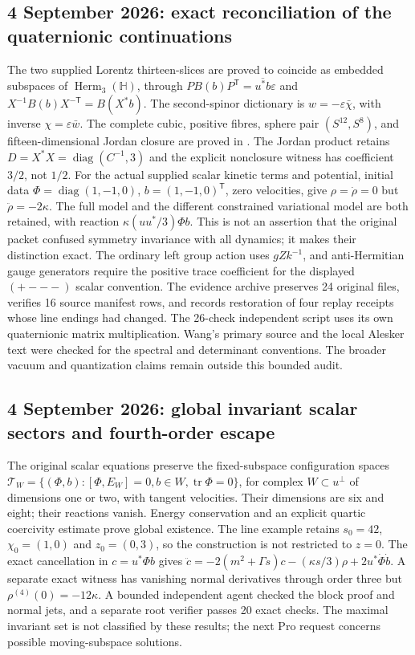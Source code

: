 \subsection*{4 September 2026: exact reconciliation of the quaternionic continuations}
The two supplied Lorentz thirteen-slices are proved to coincide as embedded
subspaces of $\operatorname{Herm}_3(\mathbb H)$, through
$PB(b)P^{\mathsf T}=\overline{u^*b}\varepsilon$ and
$X^{-1}B(b)X^{-\mathsf T}=B(X^*b)$. The second-spinor dictionary is
$w=-\varepsilon\bar\chi$, with inverse $\chi=\varepsilon\bar w$.
The complete cubic, positive fibres, sphere pair $(S^{12},S^8)$, and
fifteen-dimensional Jordan closure are proved in
.
The Jordan product retains $D=X^*X=\operatorname{diag}(C^{-1},3)$ and the
explicit nonclosure witness has coefficient $3/2$, not $1/2$.
For the actual supplied scalar kinetic terms and potential, initial data
$\Phi=\operatorname{diag}(1,-1,0)$, $b=(1,-1,0)^{\mathsf T}$, zero velocities,
give $\rho=\dot\rho=0$ but $\ddot\rho=-2\kappa$.
The full model and the different constrained variational model are both
retained, with reaction $\kappa(uu^*/3)\Phi b$. This is not an assertion
that the original packet confused symmetry invariance with all dynamics;
it makes their distinction exact. The ordinary left group action uses
$gZk^{-1}$, and anti-Hermitian gauge generators require the positive trace
coefficient for the displayed $(+---)$ scalar convention.
The evidence archive preserves 24 original files, verifies 16 source
manifest rows, and records restoration of four replay receipts whose line
endings had changed. The 26-check independent script uses its own
quaternionic matrix multiplication. Wang's primary source and the local
Alesker text were checked for the spectral and determinant conventions.
The broader vacuum and quantization claims remain outside this bounded audit.

\subsection*{4 September 2026: global invariant scalar sectors and fourth-order escape}
The original scalar equations preserve the fixed-subspace configuration
spaces $\mathcal T_W=\{(\Phi,b):[\Phi,E_W]=0,b\in W,\operatorname{tr}\Phi=0\}$,
for complex $W\subset u^\perp$ of dimensions one or two, with tangent
velocities. Their dimensions are six and eight; their reactions vanish.
Energy conservation and an explicit quartic coercivity estimate prove
global existence. The line example retains $s_0=42$, $\chi_0=(1,0)$ and
$z_0=(0,3)$, so the construction is not restricted to $z=0$.
The exact cancellation in $c=u^*\Phi b$ gives
$\ddot c=-2(m^2+\Gamma s)c-(\kappa s/3)\rho+2u^*\dot\Phi\dot b$.
A separate exact witness has vanishing normal derivatives through order
three but $\rho^{(4)}(0)=-12\kappa$. A bounded independent agent checked
the block proof and normal jets, and a separate root verifier passes
20 exact checks. The maximal invariant set is not classified by these
results; the next Pro request concerns possible moving-subspace solutions.

